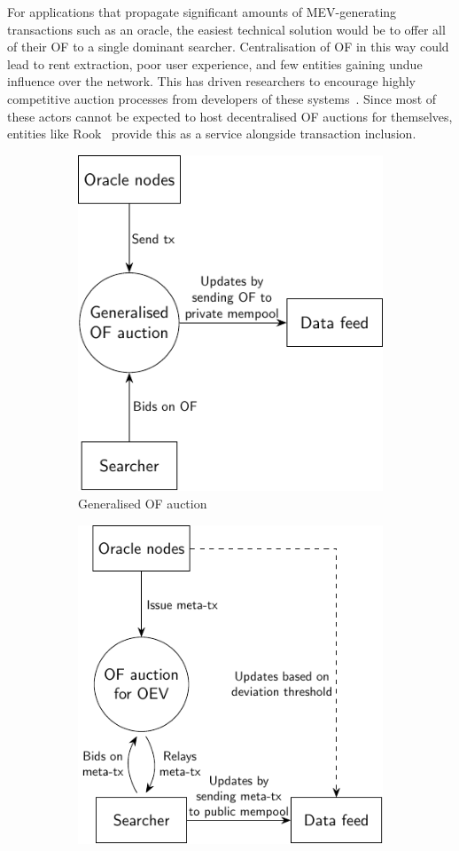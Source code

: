 \documentclass[11pt]{article}
\begin{document}
For applications that propagate significant amounts of MEV-generating transactions such as an oracle, the easiest technical solution would be to offer all of their OF to a single dominant searcher.
Centralisation of OF in this way could lead to rent extraction, poor user experience, and few entities gaining undue influence over the network.
This has driven researchers to encourage highly competitive auction processes from developers of these systems~\cite{flashbots-centralization-2}.
Since most of these actors cannot be expected to host decentralised OF auctions for themselves, entities like Rook~\cite{rook} provide this as a service alongside transaction inclusion.

\begin{figure}
	\centering
	\begin{subfigure}{0.49\textwidth}
		\centering
		\includegraphics{fig/of-auction/of-auction-a}
		\caption{Generalised OF auction}
		\label{fig:of-auction-a}
	\end{subfigure}
	\hfill
	\begin{subfigure}{0.49\textwidth}
		\centering
		\includegraphics{fig/of-auction/of-auction-b}

\end{subfigure}
\end{figure}
\end{document}
